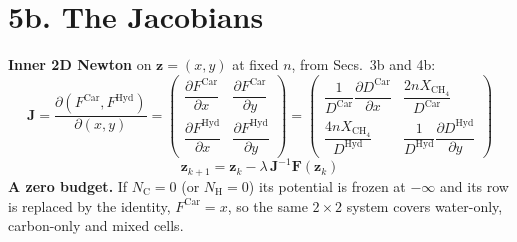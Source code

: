 \documentclass[11pt]{article}
\begin{document}
\vspace*{\fill}
\clearpage
\section*{5b. The Jacobians}
\vspace*{\fill}
\begin{minipage}[t]{\linewidth}\vspace{0pt}\small\setlength{\abovedisplayskip}{13pt}\setlength{\belowdisplayskip}{13pt}\setlength{\abovedisplayshortskip}{13pt}\setlength{\belowdisplayshortskip}{13pt}
\textbf{Inner 2D Newton} on $\mathbf z=(x,y)$ at fixed $n$, from Secs.~3b and 4b:
\begin{equation}
  \mathbf J=\frac{\partial(F^{\mathrm{Car}},F^{\mathrm{Hyd}})}{\partial(x,y)}=
  \begin{pmatrix}
    \dfrac{\partial F^{\mathrm{Car}}}{\partial x} & \dfrac{\partial F^{\mathrm{Car}}}{\partial y}\\[10pt]
    \dfrac{\partial F^{\mathrm{Hyd}}}{\partial x} & \dfrac{\partial F^{\mathrm{Hyd}}}{\partial y}
  \end{pmatrix}=
  \begin{pmatrix}
    \dfrac{1}{D^{\mathrm{Car}}}\dfrac{\partial D^{\mathrm{Car}}}{\partial x} & \dfrac{2nX_{\mathrm{CH_4}}}{D^{\mathrm{Car}}}\\[10pt]
    \dfrac{4nX_{\mathrm{CH_4}}}{D^{\mathrm{Hyd}}} & \dfrac{1}{D^{\mathrm{Hyd}}}\dfrac{\partial D^{\mathrm{Hyd}}}{\partial y}
  \end{pmatrix}
\end{equation}
\begin{equation}
  \mathbf z_{k+1}=\mathbf z_k-\lambda\,\mathbf J^{-1}\mathbf F(\mathbf z_k)
\end{equation}
\textbf{A zero budget.} If $N_{\mathrm C}=0$ (or $N_{\mathrm H}=0$) its potential is frozen at $-\infty$ and its row is replaced by the identity, $F^{\mathrm{Car}}=x$, so the same $2\times2$ system covers water-only, carbon-only and mixed cells.


\end{minipage}
\end{document}
